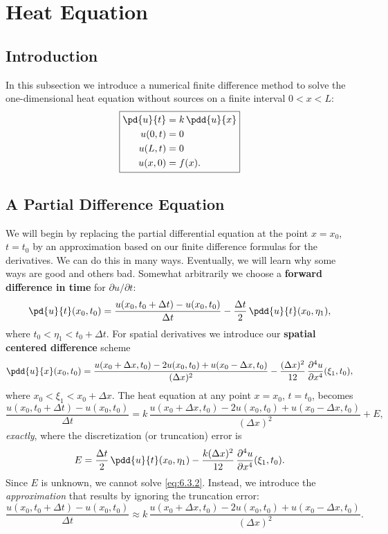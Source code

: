 \section{Heat Equation}
\label{sec:fd-heat}

\subsection{Introduction}
\label{sec:fd-heat-intro}

In this subsection we introduce a numerical finite difference method to solve the one-dimensional heat equation without sources on a finite interval $0 < x < L$:
\begin{equation}
\boxed{
\begin{aligned}
\pd{u}{t} &= k\,\pdd{u}{x} \\
u(0,t) &= 0 \\
u(L,t) &= 0 \\
u(x,0) &= f(x).
\end{aligned}
}
\label{eq:6.3.1}
\end{equation}

\subsection{A Partial Difference Equation}
\label{sec:fd-heat-pde}

We will begin by replacing the partial differential equation at the point $x = x_0$, $t = t_0$ by an approximation based on our finite difference formulas for the derivatives.  We can do this in many ways.  Eventually, we will learn why some ways are good and others bad.  Somewhat arbitrarily we choose a \textbf{forward difference in time} for $\partial u/\partial t$:
\[
\pd{u}{t}(x_0,t_0) = \frac{u(x_0, t_0 + \Delta t) - u(x_0,t_0)}{\Delta t} - \frac{\Delta t}{2}\,\pdd{u}{t}(x_0,\eta_1),
\]
where $t_0 < \eta_1 < t_0 + \Delta t$.  For spatial derivatives we introduce our \textbf{spatial centered difference} scheme
\[
\pdd{u}{x}(x_0,t_0) = \frac{u(x_0+\Delta x,t_0) - 2u(x_0,t_0) + u(x_0-\Delta x,t_0)}{(\Delta x)^2} - \frac{(\Delta x)^2}{12}\,\frac{\partial^4 u}{\partial x^4}(\xi_1,t_0),
\]
where $x_0 < \xi_1 < x_0 + \Delta x$.  The heat equation at any point $x = x_0$, $t = t_0$, becomes
\begin{equation}
\frac{u(x_0,t_0+\Delta t) - u(x_0,t_0)}{\Delta t} = k\,\frac{u(x_0+\Delta x,t_0) - 2u(x_0,t_0) + u(x_0-\Delta x,t_0)}{(\Delta x)^2} + E,
\label{eq:6.3.2}
\end{equation}
\emph{exactly}, where the discretization (or truncation) error is
\begin{equation}
E = \frac{\Delta t}{2}\,\pdd{u}{t}(x_0,\eta_1) - \frac{k(\Delta x)^2}{12}\,\frac{\partial^4 u}{\partial x^4}(\xi_1,t_0).
\label{eq:6.3.3}
\end{equation}
Since $E$ is unknown, we cannot solve \eqref{eq:6.3.2}.  Instead, we introduce the \emph{approximation} that results by ignoring the truncation error:
\begin{equation}
\frac{u(x_0,t_0+\Delta t) - u(x_0,t_0)}{\Delta t} \approx k\,\frac{u(x_0+\Delta x,t_0) - 2u(x_0,t_0) + u(x_0-\Delta x,t_0)}{(\Delta x)^2}.
\label{eq:6.3.4}
\end{equation}

